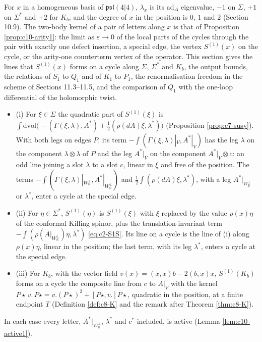 For $x$ in a homogeneous basis of $\mathfrak{psl}(4|4)$, $\lambda_x$ is its $\mathrm{ad}_\Delta$ eigenvalue, $-1$ on $\Sigma$, $+1$ on $\Sigma^*$ and $+2$ for $K_b$, and the degree of $x$ in the position is $0$, $1$ and $2$ (Section 10.9). The two-body kernel of a pair of letters along $x$ is that of Proposition \ref{prop:c10-arity1}: the limit as $\varepsilon\to0$ of the local parts of the cycles through the pair with exactly one defect insertion, a special edge, the vertex $S^{(1)}(x)$ on the cycle, or the arity-one counterterm vertex of the operator. This section gives the lines that $S^{(1)}(x)$ forms on a cycle along $\Sigma$, $\Sigma^*$ and $K_b$, the output bounds, the relations of $S_1$ to $Q_1$ and of $K_1$ to $P_1$, the renormalisation freedom in the scheme of Sections 11.3--11.5, and the comparison of $Q_1$ with the one-loop differential of the holomorphic twist.

\begin{lemma}
\label{lem:c11-lines}
\begin{itemize}
\item (i) For $\xi\in\Sigma$ the quadratic part of $S^{(1)}(\xi)$ is $\int\mathrm{dvol}\big(-(\Gamma(\xi,\lambda),A^*)+\tfrac12(\rho(dA)\xi,\lambda^*)\big)$ (Proposition \ref{prop:c7-susy}). With both legs on edges $P$, its term $-\int(\Gamma(\xi,\lambda)|_V,A^*|_V)$ has the leg $\lambda$ on the component $\lambda\otimes\lambda$ of $P$ and the leg $A^*|_V$ on the component $A^*|_V\otimes c$: an odd line joining a slot $\lambda$ to a slot $c$, linear in $\xi$ and free of the position. The terms $-\int(\Gamma(\xi,\lambda)|_{W_{\mathbb R}^\perp},A^*|_{W_{\mathbb R}^\perp})$ and $\tfrac12\int(\rho(dA)\xi,\lambda^*)$, with a leg $A^*|_{W_{\mathbb R}^\perp}$ or $\lambda^*$, enter a cycle at the special edge.
\item (ii) For $\eta\in\Sigma^*$, $S^{(1)}(\eta)$ is $S^{(1)}(\xi)$ with $\xi$ replaced by the value $\rho(x)\eta$ of the conformal Killing spinor, plus the translation-invariant term $-\int(\rho(A|_{W_{\mathbb R}^\perp})\eta,\lambda^*)$ \eqref{eq:c2-S1S}. Its line on a cycle is the line of (i) along $\rho(x)\eta$, linear in the position; the last term, with its leg $\lambda^*$, enters a cycle at the special edge.
\item (iii) For $K_b$, with the vector field $v(x)=(x,x)b-2(b,x)x$, $S^{(1)}(K_b)$ forms on a cycle the composite line from $c$ to $A|_V$ with the kernel $P\star\,v.\,P\star=v.(P\star)^2+[P\star,v.]P\star$, quadratic in the position, at a finite endpoint $T$ (Definition \ref{def:c8-K} and the remark after Theorem \ref{thm:c8-K}).
\end{itemize}
In each case every letter, $A^*|_{W_{\mathbb R}^\perp}$, $\lambda^*$ and $c^*$ included, is active (Lemma \ref{lem:c10-active1}).
\end{lemma}


